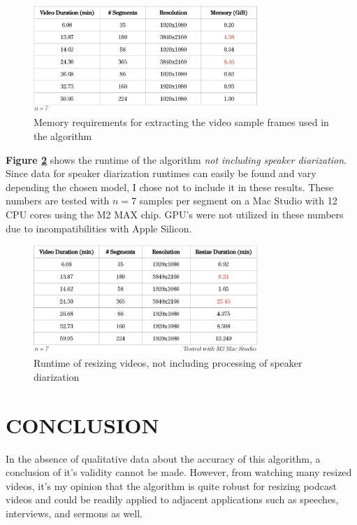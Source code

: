 \documentclass{article}
\begin{document}
\begin{figure}[htb]
\begin{minipage}[b]{1.0\linewidth}
    \centering
    \centerline{\includegraphics[width=8.5cm]{memory.png}}
    \medskip
\end{minipage}
\caption{Memory requirements for extracting the video sample frames used in the algorithm}
\label{fig:memory}
\end{figure}

\textbf{Figure \ref{fig:speed}} shows the runtime of the algorithm \emph{not including speaker diarization}. Since data for speaker diarization runtimes can easily be found and vary depending the chosen model, I chose not to include it in these results. These numbers are tested with $n = 7$ samples per segment on a Mac Studio with 12 CPU cores using the M2 MAX chip. GPU's were not utilized in these numbers due to incompatibilities with Apple Silicon.

\begin{figure}[htb]
\begin{minipage}[b]{1.0\linewidth}
    \centering
    \centerline{\includegraphics[width=8.5cm]{speed.png}}
    \medskip
\end{minipage}
\caption{Runtime of resizing videos, not including processing of speaker diarization}
\label{fig:speed}
\end{figure}

\section{CONCLUSION}
\label{sec:foot}
In the absence of qualitative data about the accuracy of this algorithm, a conclusion of it's validity cannot be made. However, from watching many resized videos, it's my opinion that the algorithm is quite robust for resizing podcast videos and could be readily applied to adjacent applications such as speeches, interviews, and sermons as well.
\end{document}
